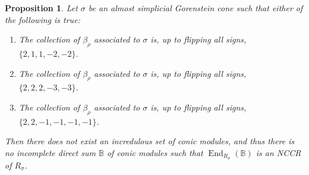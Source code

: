 \documentclass[10pt,a4paper]{amsart}
\newtheorem{proposition}{Proposition}
\newcommand{\End}{\operatorname{End}}
\begin{document}
\begin{proposition}
    \label{Prop:SpecialCasesWithoutNCCR}
    Let $\sigma$ be an almost simplicial Gorenstein cone such that either of the following is true:
    \begin{enumerate}
        \item The collection of $\beta_\rho$ associated to $\sigma$ is, up to flipping all signs, $\{2,1,1,-2,-2\}$.
        \item The collection of $\beta_\rho$ associated to $\sigma$ is, up to flipping all signs, $\{2,2,2,-3,-3\}$.
        \item The collection of $\beta_\rho$ associated to $\sigma$ is, up to flipping all signs, $\{2,2,-1,-1,-1,-1\}$.
    \end{enumerate}
    Then there does not exist an incredulous set of conic modules, and thus there is no incomplete direct sum $\mathbb{B}$ of conic modules such that $\End_{R_\sigma}(\mathbb{B})$ is an NCCR of $R_\sigma$.
\end{proposition}
\end{document}

